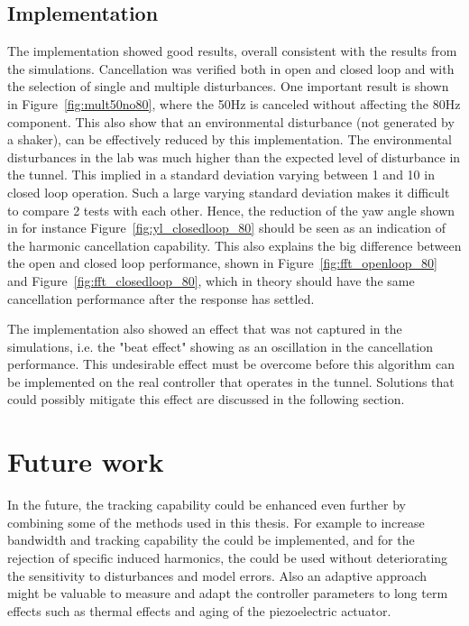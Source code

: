 \subsection{Implementation}
The \abbrRFDC implementation showed good results, overall consistent with the results from the simulations. Cancellation was verified both in open and closed loop and with the selection of single and multiple disturbances. One important result is shown in Figure~\ref{fig:mult50no80}, where the 50Hz is canceled without affecting the 80Hz component. This also show that an environmental disturbance (not generated by a shaker), can be effectively reduced by this implementation. The environmental disturbances in the lab was much higher than the expected level of disturbance in the tunnel. This implied in a standard deviation varying between \unit{1}{\micro\radian} and \unit{10}{\micro\radian} in closed loop operation. Such a large varying standard deviation makes it difficult to compare 2 tests with each other. Hence, the reduction of the yaw angle shown in for instance Figure~\ref{fig:yl_closedloop_80} should be seen as an indication of the harmonic cancellation capability. This also explains the big difference between the open and closed loop performance, shown in Figure~\ref{fig:fft_openloop_80} and Figure~\ref{fig:fft_closedloop_80}, which in theory should have the same cancellation performance after the response has settled.

The implementation also showed an effect that was not captured in the simulations, i.e. the "beat effect" showing as an oscillation in the cancellation performance. This undesirable effect must be overcome before this algorithm can be implemented on the real controller that operates in the \abbrLHC tunnel. Solutions that could possibly mitigate this effect are discussed in the following section.

\section{Future work}
In the future, the tracking capability could be enhanced even further by combining some of the methods used in this thesis. For example to increase bandwidth and tracking capability the \abbrIRC could be implemented, and for the rejection of specific induced harmonics, the \abbrRFDC could be used without deteriorating the sensitivity to disturbances and model errors. Also an adaptive approach might be valuable to measure and adapt the controller parameters to long term effects such as thermal effects and aging of the piezoelectric actuator.

